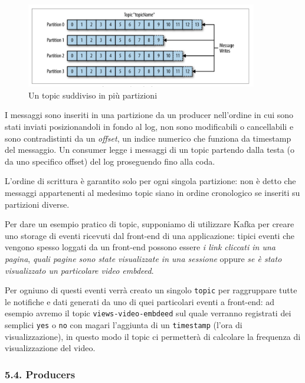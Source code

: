 \documentclass[]{article}
\begin{document}
\begin{figure}
\centering
\includegraphics[width=0.90000\textwidth]{../images/topic-and-partitions.png}
\caption{Un topic suddiviso in più partizioni \label{figure_3}}
\end{figure}

I messaggi sono inseriti in una partizione da un producer nell'ordine in
cui sono stati inviati posizionandoli in fondo al log, non sono
modificabili o cancellabili e sono contradistinti da un \emph{offset},
un indice numerico che funziona da timestamp del messaggio. Un consumer
legge i messaggi di un topic partendo dalla testa (o da uno specifico
offset) del log proseguendo fino alla coda.

L'ordine di scrittura è garantito solo per ogni singola partizione: non
è detto che messaggi appartenenti al medesimo topic siano in ordine
cronologico se inseriti su partizioni diverse.

Per dare un esempio pratico di topic, supponiamo di utilizzare Kafka per
creare uno storage di eventi ricevuti dal front-end di una applicazione:
tipici eventi che vengono spesso loggati da un front-end possono essere
\emph{i link cliccati in una pagina}, \emph{quali pagine sono state
visualizzate in una sessione} oppure \emph{se è stato visualizzato un
particolare video embdeed}.

Per ogniuno di questi eventi verrà creato un singolo \texttt{topic} per
raggruppare tutte le notifiche e dati generati da uno di quei
particolari eventi a front-end: ad esempio avremo il topic
\texttt{views-video-embdeed} sul quale verranno registrati dei semplici
\texttt{yes} o \texttt{no} con magari l'aggiunta di un
\texttt{timestamp} (l'ora di visualizzazione), in questo modo il topic
ci permetterà di calcolare la frequenza di visualizzazione del video.

\newpage

\subsubsection{5.4. Producers}\label{producers}
\end{document}
